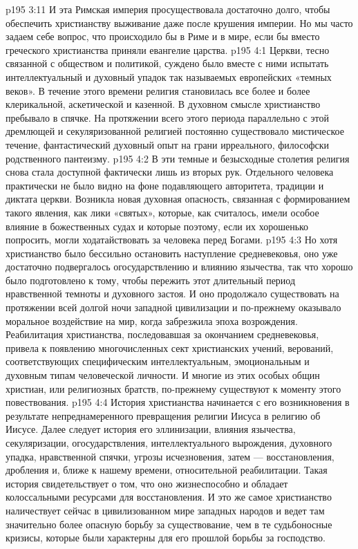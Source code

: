 \vs p195 3:11 И эта Римская империя просуществовала достаточно долго, чтобы обеспечить христианству выживание даже после крушения империи. Но мы часто задаем себе вопрос, что происходило бы в Риме и в мире, если бы вместо греческого христианства приняли евангелие царства.
\vs p195 4:1 Церкви, тесно связанной с обществом и политикой, суждено было вместе с ними испытать интеллектуальный и духовный упадок так называемых европейских «темных веков». В течение этого времени религия становилась все более и более клерикальной, аскетической и казенной. В духовном смысле христианство пребывало в спячке. На протяжении всего этого периода параллельно с этой дремлющей и секуляризованной религией постоянно существовало мистическое течение, фантастический духовный опыт на грани ирреального, философски родственного пантеизму.
\vs p195 4:2 В эти темные и безысходные столетия религия снова стала доступной фактически лишь из вторых рук. Отдельного человека практически не было видно на фоне подавляющего авторитета, традиции и диктата церкви. Возникла новая духовная опасность, связанная с формированием такого явления, как лики «святых», которые, как считалось, имели особое влияние в божественных судах и которые поэтому, если их хорошенько попросить, могли ходатайствовать за человека перед Богами.
\vs p195 4:3 Но хотя христианство было бессильно остановить наступление средневековья, оно уже достаточно подвергалось огосударствлению и влиянию язычества, так что хорошо было подготовлено к тому, чтобы пережить этот длительный период нравственной темноты и духовного застоя. И оно продолжало существовать на протяжении всей долгой ночи западной цивилизации и по\hyp{}прежнему оказывало моральное воздействие на мир, когда забрезжила эпоха возрождения. Реабилитация христианства, последовавшая за окончанием средневековья, привела к появлению многочисленных сект христианских учений, верований, соответствующих специфическим интеллектуальным, эмоциональным и духовным типам человеческой личности. И многие из этих особых общин христиан, или религиозных братств, по\hyp{}прежнему существуют к моменту этого повествования.
\vs p195 4:4 \pc История христианства начинается с его возникновения в результате непреднамеренного превращения религии Иисуса в религию об Иисусе. Далее следует история его эллинизации, влияния язычества, секуляризации, огосударствления, интеллектуального вырождения, духовного упадка, нравственной спячки, угрозы исчезновения, затем --- восстановления, дробления и, ближе к нашему времени, относительной реабилитации. Такая история свидетельствует о том, что оно жизнеспособно и обладает колоссальными ресурсами для восстановления. И это же самое христианство наличествует сейчас в цивилизованном мире западных народов и ведет там значительно более опасную борьбу за существование, чем в те судьбоносные кризисы, которые были характерны для его прошлой борьбы за господство.
